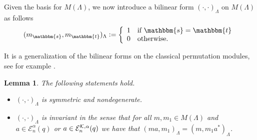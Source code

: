 \documentclass[10pt,a4,twoside,hidelinks,rm]{article}
\newcommand\es{\mathbbm{s}}
\newcommand\et{\mathbbm{t}}
\newcommand{\Ea}{ {\mathcal E}_n^{\alpha}(q)}
\newcommand{\Eak}{ {\mathcal E}_n^{ {\cal K}, \alpha}(q)}
\theoremstyle{plain}
\newtheorem{lem}[teo]{Lemma}
\begin{document}
\medskip


Given the basis for $ M(\Lambda) $, we now introduce a bilinear form $ (\cdot, \cdot)_{\Lambda} $
on $ M(\Lambda) $ as follows
\begin{equation}\label{bildef}
  (m_{\es}, m_{\et})_{\Lambda} := \left\{ \begin{array}{ll} 1 & \mbox{if } \es = \et\\
    0 & \mbox{otherwise. } \end{array} \right.
\end{equation}

It is a generalization of the bilinear forms on the classical permutation modules,
see for example \cite{DJM}.
\begin{lem}\label{lemma13}
The following statements hold. 
  \begin{itemize}
\setlength\itemsep{-1.5em}
\item[(1)] 
$ (\cdot, \cdot)_{\Lambda} $ is symmetric and nondegenerate.
  \newline
\item[(2)]
  $ (\cdot, \cdot)_{\Lambda} $ is invariant in the sense that for all $ m,m_1 \in M(\Lambda) $ and
  $ a \in \Ea $ or $ a\in \Eak $ we have that 
$ (m a, m_1)_{\Lambda} = (m , m_1 a^{\ast})_{\Lambda} $. 
\end{itemize}
\end{lem}
\end{document}
